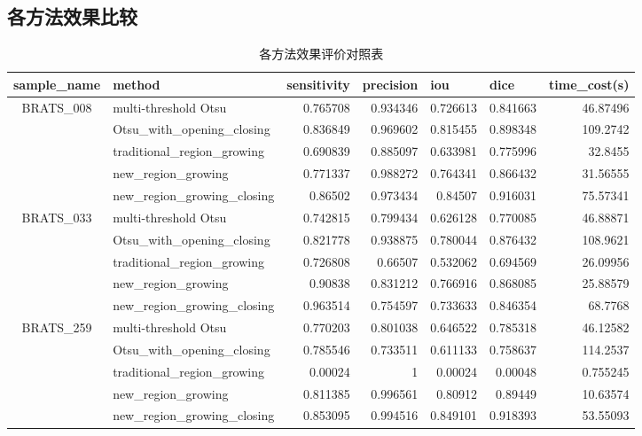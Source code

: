 \documentclass[UTF8]{ctexart}
\begin{document}
\subsection{各方法效果比较}
\begin{table}[H]
    \centering
    \caption{各方法效果评价对照表}
      \begin{tabular}{clrrrrr}
        \toprule
      \multicolumn{1}{l}{sample\_name} & method & \multicolumn{1}{l}{sensitivity} & \multicolumn{1}{l}{precision} & \multicolumn{1}{l}{iou} & \multicolumn{1}{l}{dice} & \multicolumn{1}{l}{time\_cost(s)} \\
            \midrule
      \multirow{5}[0]{*}{BRATS\_008} & multi-threshold Otsu & 0.765708 & 0.934346 & 0.726613 & 0.841663 & 46.87496 \\
            & Otsu\_with\_opening\_closing & 0.836849 & 0.969602 & 0.815455 & 0.898348 & 109.2742 \\
            & traditional\_region\_growing & 0.690839 & 0.885097 & 0.633981 & 0.775996 & 32.8455 \\
            & new\_region\_growing & 0.771337 & 0.988272 & 0.764341 & 0.866432 & 31.56555 \\
            & new\_region\_growing\_closing & 0.86502 & 0.973434 & 0.84507 & 0.916031 & 75.57341 \\
      \multirow{5}[0]{*}{BRATS\_033} & multi-threshold Otsu & 0.742815 & 0.799434 & 0.626128 & 0.770085 & 46.88871 \\
            & Otsu\_with\_opening\_closing & 0.821778 & 0.938875 & 0.780044 & 0.876432 & 108.9621 \\
            & traditional\_region\_growing & 0.726808 & 0.66507 & 0.532062 & 0.694569 & 26.09956 \\
            & new\_region\_growing & 0.90838 & 0.831212 & 0.766916 & 0.868085 & 25.88579 \\
            & new\_region\_growing\_closing & 0.963514 & 0.754597 & 0.733633 & 0.846354 & 68.7768 \\
      \multirow{5}[0]{*}{BRATS\_259} & multi-threshold Otsu & 0.770203 & 0.801038 & 0.646522 & 0.785318 & 46.12582 \\
            & Otsu\_with\_opening\_closing & 0.785546 & 0.733511 & 0.611133 & 0.758637 & 114.2537 \\
            & traditional\_region\_growing & 0.00024 & 1     & 0.00024 & 0.00048 & 0.755245 \\
            & new\_region\_growing & 0.811385 & 0.996561 & 0.80912 & 0.89449 & 10.63574 \\
            & new\_region\_growing\_closing & 0.853095 & 0.994516 & 0.849101 & 0.918393 & 53.55093 \\
            \bottomrule
      \end{tabular}%
    \label{tab:addlabel}%
  \end{table}%
  
\end{document}
